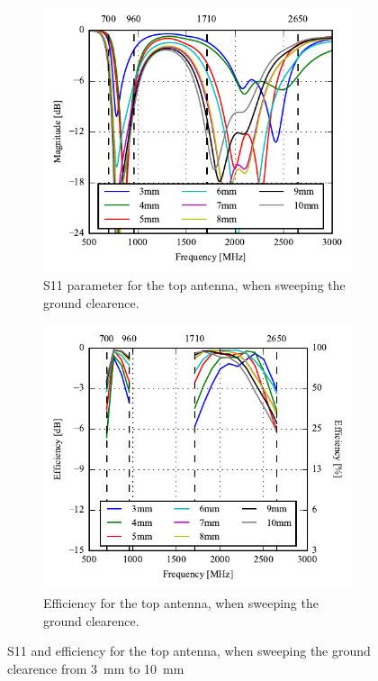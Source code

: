 \begin{figure}[htbp]
   \begin{subfigure}[b]{0.49\linewidth}
        \centering
        \includegraphics{img/tech_sol/monopole/5mm/s11_5mm}
        \caption{S11 parameter for the top antenna, when sweeping the ground clearence.}
        \label{fig:s11_mono_sim_5mm}
    \end{subfigure}
    \hfill
    \begin{subfigure}[b]{0.49\linewidth}
        \centering
        \includegraphics{img/tech_sol/monopole/5mm/eff_5mm}
        \caption{Efficiency for the top antenna, when sweeping the ground clearence.}
        \label{fig:eff_mono_sim_5mm}
    \end{subfigure}
    \caption{S11 and efficiency for the top antenna, when sweeping the ground clearence from \SI{3}{mm} to \SI{10}{mm}}
    \label{fig:eff_s11_mono_sim_5mm}
\end{figure}

